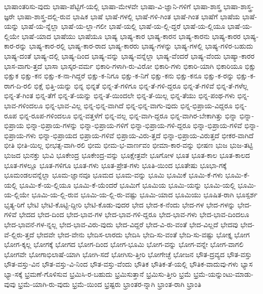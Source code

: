 {ಭಾಷಾಂತರಿಸು-ವುದು
ಭಾಷಾ-ಪೆಟ್ಟಿಗೆ-ಯಲ್ಲಿ
ಭಾಷಾ-ಮೇಳವೇ
ಭಾಷಾ-ವಿ-ಜ್ಞಾನಿ-ಗಳಿಗೆ
ಭಾಷಾ-ಶಾಸ್ತ್ರ
ಭಾಷಾ-ಶಾಸ್ತ್ರ-ಜ್ಞರೇ
ಭಾಷಾ-ಶಾಸ್ತ್ರ-ದಲ್ಲಿ-ರುವ
ಭಾಷಿಕ
ಭಾಷೆ
ಭಾಷೆ-ಗಳಲ್ಲಿ
ಭಾಷೆ-ಗಳಿ-ಗಿಂತ
ಭಾಷೆ-ಗಿಂತ
ಭಾಷೆಗೆ
ಭಾಷೆಯ
ಭಾಷೆ-ಯನ್ನು
ಭಾಷೆ-ಯ-ನ್ನೆಲ್ಲಾ
ಭಾಷೆ-ಯ-ಲ್ಲಾ-ಗಲೀ
ಭಾಷೆ-ಯಲ್ಲಿ
ಭಾಷೆ-ಯ-ಲ್ಲಿ-ದ್ದರೆ
ಭಾಷೆ-ಯ-ಲ್ಲಿಯೂ
ಭಾಷೆ-ಯ-ಲ್ಲಿಯೇ
ಭಾಷೆ-ಯಾದ
ಭಾಷೆಯು
ಭಾಷೆಯೂ
ಭಾಷ್ಯ
ಭಾಷ್ಯ-ಕಾರ
ಭಾಷ್ಯ-ಕಾರನ
ಭಾಷ್ಯ-ಕಾರನು
ಭಾಷ್ಯ-ಕಾರರ
ಭಾಷ್ಯ-ಕಾರ-ರನ್ನು
ಭಾಷ್ಯ-ಕಾರ-ರಲ್ಲಿ
ಭಾಷ್ಯ-ಕಾರ-ರಾದ
ಭಾಷ್ಯ-ಕಾರರು
ಭಾಷ್ಯ-ಗಳನ್ನು
ಭಾಷ್ಯ-ಗಳಲ್ಲಿ
ಭಾಷ್ಯ-ಗಳಿರ-ಬಹುದು
ಭಾಷ್ಯ-ದಂತೆ
ಭಾಷ್ಯ-ದಲ್ಲಿ
ಭಾಷ್ಯ-ದಿಂದ
ಭಾಷ್ಯ-ವನ್ನು
ಭಾಷ್ಯ-ವನ್ನೆಲ್ಲಾ
ಭಾಷ್ಯ-ವೆಂದರೆ
ಭಾಷ್ಯ-ವೆಂದು
ಭಾಷ್ಯಾ-ಕಾರರ
ಭಾಸ-ವಾಗು-ತ್ತದೆ
ಭಾಸಾ
ಭಾಸ್ಕರ-ವರ್ಮ
ಭಿಕಾರಿ-ಗಳಾಗಿ-ರು-ವಿರೋ
ಭಿಕಾರಿ-ಗಳು
ಭಿಕಾರಿ-ಯಾಗಿ
ಭಿಕಾರಿಯೂ
ಭಿಕ್ಷು
ಭಿಕ್ಷುಕ
ಭಿಕ್ಷು-ಕನ
ಭಿಕ್ಷು-ಕ-ನಾ-ಗಿದ್ದರೆ
ಭಿಕ್ಷು-ಕ-ನಿಗೂ
ಭಿಕ್ಷು-ಕ-ನಿಗೆ
ಭಿಕ್ಷು-ಕನು
ಭಿಕ್ಷು-ಕನೂ
ಭಿಕ್ಷು-ಕ-ರನ್ನು
ಭಿಕ್ಷು-ಕ-ರಾಗ-ದಿ-ರಲಿ
ಭಿಕ್ಷೆ
ಭಿತ್ತಿ-ಯನ್ನು
ಭಿನ್ನ
ಭಿನ್ನತೆ
ಭಿನ್ನ-ತೆ-ಗಳಿಗೂ
ಭಿನ್ನ-ತೆ-ಗಳಿ-ದ್ದರೂ
ಭಿನ್ನ-ತೆ-ಗಳಿವೆ
ಭಿನ್ನ-ತೆ-ಗಳೆಲ್ಲ
ಭಿನ್ನ-ತೆ-ಗಿಂತ
ಭಿನ್ನ-ತೆಗೆ
ಭಿನ್ನ-ತೆ-ಯನ್ನು
ಭಿನ್ನ-ತೆ-ಯಿಂದಲೇ
ಭಿನ್ನ-ತೆ-ಯಿಲ್ಲ
ಭಿನ್ನ-ತೆಯು
ಭಿನ್ನ-ಪಂಥ-ಗಳು
ಭಿನ್ನ-ಭಾವ-ಗಳಿಂದಲೂ
ಭಿನ್ನ-ಭಾವ-ವಿಲ್ಲ
ಭಿನ್ನ-ಭಿನ್ನ-ವಾಗಿದೆ
ಭಿನ್ನ-ಭಿನ್ನ-ವಾಗು-ವುದು
ಭಿನ್ನ-ಭಿಪ್ರಾಯ-ವಿದ್ದರೂ
ಭಿನ್ನ-ರೂಪ
ಭಿನ್ನ-ರೂಪ-ಗಳಿಂದಲೂ
ಭಿನ್ನ-ವತ್ತಳೆಗೆ
ಭಿನ್ನ-ವಲ್ಲ
ಭಿನ್ನ-ವಾಗಿ-ದ್ದರೂ
ಭಿನ್ನ-ವಾಗಿರ-ಬೇಕಾಗಿತ್ತು
ಭಿನ್ನಾ
ಭಿನ್ನಾ-ಭಿಪ್ರಾಯ
ಭಿನ್ನಾ-ಭಿಪ್ರಾಯ-ಗಳನ್ನು
ಭಿನ್ನಾ-ಭಿಪ್ರಾಯ-ಗಳಿಗೆ
ಭಿನ್ನಾ-ಭಿಪ್ರಾಯ-ಗಳಿ-ದ್ದರೂ
ಭಿನ್ನಾ-ಭಿಪ್ರಾಯ-ಗಳಿವೆ
ಭಿನ್ನಾ-ಭಿಪ್ರಾಯ-ಗಳು
ಭಿನ್ನಾ-ಭಿಪ್ರಾಯದ
ಭಿಪ್ರಾಯ-ಗಳಿವೆ
ಭಿಪ್ರಾಯ-ವಿರು-ತ್ತದೆ
ಭಿನ್ನಾ-ಭಿಪ್ರಾಯ-ವಿರುತ್ತದೆ
ಭೀಕರ-ವಾಗಿದೆ
ಭೀತಿ
ಭೀತಿ-ಯಿಲ್ಲ
ಭೀಭತ್ಸ-ವಾಗಿ-ರಲಿ
ಭೀಮ
ಭೀಮ-ಭ-ವಾರ್ಣವಂ
ಭೀಮಾ-ಕಾರ-ವನ್ನು
ಭೀಷಣ
ಭುಜ
ಭುಜ-ತಟ್ಟಿ
ಭುಜದ
ಭುನಕ್ತು
ಭುವಿ
ಭೂಕೇಂದ್ರ
ಭೂಕೇಂದ್ರ-ವನ್ನು
ಭೂಕ್ಷೇತ್ರವೇ
ಭೂಗೋಳ
ಭೂತ
ಭೂತ-ಕಾಲ
ಭೂತ-ಕಾಲದ
ಭೂತ-ಗಳಲ್ಲೂ
ಭೂತ-ಗಳಿಗೂ
ಭೂತ-ಗಳು
ಭೂತ-ಪ್ರೇತ-ಗಳು
ಭೂತಿ-ಯಿಂದ
ಭೂತೇಷು
ಭೂಭಾ-ಗಕ್ಕೆ
ಭೂಮಂಡಲವನ್ನೆಲ್ಲಾ
ಭೂಮ-ಜ್ಞಾನವೂ
ಭೂಮದ
ಭೂಮ-ವನ್ನು
ಭೂಮಿ
ಭೂಮಿಕೆ
ಭೂಮಿ-ಕೆ-ಗಳು
ಭೂಮಿ-ಕೆ-ಯಲ್ಲಿ
ಭೂಮಿ-ಕೆ-ಯ-ಲ್ಲಿಯೂ
ಭೂಮಿ-ಕೆ-ಯೆಂದರೆ
ಭೂಮಿಗೆ
ಭೂಮಿಯ
ಭೂಮಿ-ಯನ್ನು
ಭೂಮಿ-ಯಲ್ಲಿ
ಭೂಮಿ-ಯ-ಲ್ಲಿಯೇ
ಭೂಮಿ-ಯ-ಲ್ಲಿ-ರುವ
ಭೂಮಿ-ಯ-ಲ್ಲಿ-ರು-ವಷ್ಟು
ಭೂಮಿ-ಯಾದ
ಭೂಮಿಯು
ಭೂಷಿತ-ರಾಗಿ
ಭೂಸ್ಪರ್ಶ
ಭೃತ್ಯ-ರಿಗೆ
ಭೇಟಿ
ಭೇಟಿ-ಕೊಟ್ಟಿ-ದ್ದೀರಿ
ಭೇಟಿ-ಕೊಡು-ವುದರ
ಭೇದ
ಭೇದ-ಕ-ನೆಂದು
ಭೇದ-ಗಳ
ಭೇದ-ಗಳನ್ನು
ಭೇದ-ಗಳಿವೆ
ಭೇದದ
ಭೇದ-ದಿಂದ
ಭೇದ-ಭಾವ-ಗಳ
ಭೇದ-ಭಾವ-ಗಳಿ-ದ್ದರೂ
ಭೇದ-ಭಾವ-ಗಳು
ಭೇದ-ಭಾವ-ದಿಂದಲೂ
ಭೇದ-ಭಾವನೆ-ಗಳ-ನ್ನಲ್ಲ
ಭೇದ-ಭಾವ-ವಿರು-ವುದು
ಭೇದ-ವಿದ್ದರೆ
ಭೇದ-ವಿ-ರು-ವಂತೆ
ಭೇದ-ವಿಲ್ಲದೆ
ಭೇದವು
ಭೇದ-ವೆ-ಲ್ಲಿರು-ತ್ತದೆ
ಭೇದವೇ
ಭೇದ-ವೇನು
ಭೇದಿಸ-ಲಾರದು
ಭೇದಿಸಿ
ಭೇದಿ-ಸು-ವಂತೆ
ಭೇದಿ-ಸು-ವಷ್ಟು
ಭೋಕ್ತೃ
ಭೋಗ
ಭೋಗ-ಕ್ಕಲ್ಲ
ಭೋಗಕ್ಕೆ
ಭೋಗದ
ಭೋಗ-ದಿಂದ
ಭೋಗ-ಭೂಮಿ
ಭೋಗ-ವನ್ನು
ಭೋಗ-ವನ್ನೇ
ಭೋಗ-ವಾಗಲಿ
ಭೋಗವೇ
ಭೋಗಾಭಿಲಾಷೆ-ಯಾಗಿ
ಭೋಗಿ-ಸದೆ
ಭೋಗಿಸು-ತ್ತೀರಿ
ಭೋಗೇಚ್ಛೆ
ಭೋಜನ
ಭೌತ-ದ್ರವ್ಯದ
ಭೌತ-ವಸ್ತು
ಭೌತ-ವಸ್ತು-ವಿನ
ಭೌತ-ವಸ್ತು-ವಿ-ನಿಂದ
ಭೌತ-ವಸ್ತು-ವೆಂದು
ಭೌತಿಕ
ಭೌತಿಕ-ತೆ-ಯಲ್ಲಿ
ಭೌತಿಕ-ವಾದುವು-ಗಳು
ಭ್ಯಾಸ
ಭ್ಯಾ-ಸಕ್ಕೆ
ಭ್ರಮಣೆ-ಗೊಳಿಸುವ
ಭ್ರಮಿಸಿ-ರ-ಬಹುದು
ಭ್ರಮಿಸುತ್ತಾನೆ
ಭ್ರಮಿಸು-ತ್ತೀರಿ
ಭ್ರಮೆ
ಭ್ರಮೆ-ಯನ್ನುಂಟು-ಮಾಡು-ವುವು
ಭ್ರಮೆ-ಯಾಗಿ-ರು-ವುದು
ಭ್ರಮೆ-ಯಿಂದ
ಭ್ರಷ್ಟರು
ಭ್ರಾಂತರ-ನ್ನಾಗಿ
ಭ್ರಾಂತ-ರಾಗಿ
ಭ್ರಾಂತಿ
}
